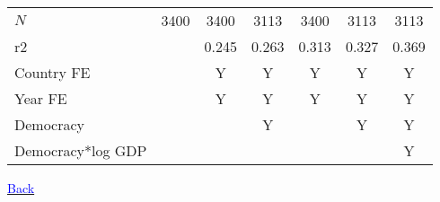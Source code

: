 \documentclass[10pt,letterpaper,subeqn]{beamer}
\begin{document}
\begin{frame}[label=RightsComp]
\begin{table}[htbp]
{\begin{tabular}{l*{6}{c}}
\hline
\(N\)       &        3400         &        3400         &        3113         &        3400         &        3113         &        3113         \\
r2          &                     &       0.245         &       0.263         &       0.313         &       0.327         &       0.369         \\
\hline
Country FE        &                     &    Y                 &      Y               &     Y         &           Y          &     Y         \\
Year FE            &                     &    Y                 &      Y               &     Y         &           Y          &     Y         \\
Democracy       &                     &                     &     Y &                     &      Y  &      Y\\
Democracy*log GDP   &                     &                     &                     &                     &                     &      Y\\

\hline
\end{tabular}}
\end{table}
\hyperlink{Rights}{\textcolor{blue}{Back}}
\end{frame}
\end{document}

